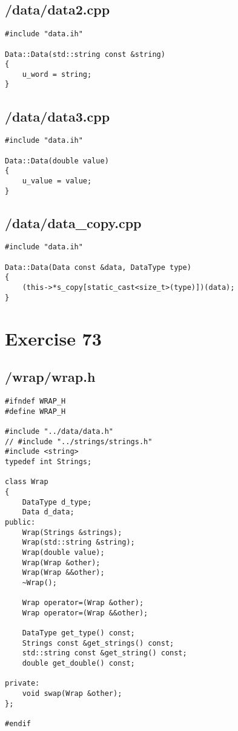 \documentclass{article}
\begin{document}
\subsection*{/data/data2.cpp}
\begin{verbatim}
#include "data.ih"

Data::Data(std::string const &string)
{
    u_word = string;
}
\end{verbatim}
\subsection*{/data/data3.cpp}
\begin{verbatim}
#include "data.ih"

Data::Data(double value)
{
    u_value = value;
}

\end{verbatim}
\subsection*{/data/data\_copy.cpp}
\begin{verbatim}
#include "data.ih"

Data::Data(Data const &data, DataType type)
{
    (this->*s_copy[static_cast<size_t>(type)])(data);
}
\end{verbatim}


\section*{Exercise 73}
\subsection*{/wrap/wrap.h}
\begin{verbatim}
#ifndef WRAP_H
#define WRAP_H

#include "../data/data.h"
// #include "../strings/strings.h"
#include <string>
typedef int Strings;

class Wrap
{
    DataType d_type;
    Data d_data;
public:
    Wrap(Strings &strings);
    Wrap(std::string &string);
    Wrap(double value);
    Wrap(Wrap &other);
    Wrap(Wrap &&other);
    ~Wrap();

    Wrap operator=(Wrap &other);
    Wrap operator=(Wrap &&other);

    DataType get_type() const;
    Strings const &get_strings() const;
    std::string const &get_string() const;
    double get_double() const;

private:
    void swap(Wrap &other);
};

#endif

\end{verbatim}
\end{document}
